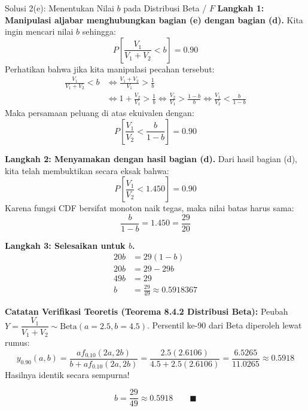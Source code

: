 \documentclass[10pt,twoside]{article}
\begin{document}
\begin{solbox}{Solusi 2(e): Menentukan Nilai $b$ pada Distribusi Beta / $F$}
\textbf{Langkah 1: Manipulasi aljabar menghubungkan bagian (e) dengan bagian (d).}
Kita ingin mencari nilai $b$ sehingga:
\[
P\left[\frac{V_1}{V_1 + V_2} < b\right] = 0.90
\]
Perhatikan bahwa jika kita manipulasi pecahan tersebut:
\begin{align*}
  \frac{V_1}{V_1 + V_2} < b &\iff \frac{V_1 + V_2}{V_1} > \frac{1}{b} \\
  &\iff 1 + \frac{V_2}{V_1} > \frac{1}{b} \iff \frac{V_2}{V_1} > \frac{1 - b}{b} \iff \frac{V_1}{V_2} < \frac{b}{1 - b}
\end{align*}
Maka persamaan peluang di atas ekuivalen dengan:
\[
P\left[\frac{V_1}{V_2} < \frac{b}{1 - b}\right] = 0.90
\]

\textbf{Langkah 2: Menyamakan dengan hasil bagian (d).}
Dari hasil bagian (d), kita telah membuktikan secara eksak bahwa:
\[
P\left[\frac{V_1}{V_2} < 1.450\right] = 0.90
\]
Karena fungsi CDF bersifat monoton naik tegas, maka nilai batas harus sama:
\[
\frac{b}{1 - b} = 1.450 = \frac{29}{20}
\]

\textbf{Langkah 3: Selesaikan untuk $b$.}
\begin{align*}
  20 b &= 29(1 - b) \\
  20 b &= 29 - 29 b \\
  49 b &= 29 \\
  b &= \frac{29}{49} \approx 0.5918367
\end{align*}

\textbf{Catatan Verifikasi Teoretis (Teorema 8.4.2 Distribusi Beta):}
Peubah $Y = \dfrac{V_1}{V_1 + V_2} \sim \text{Beta}(a = 2.5, b = 4.5)$.
Persentil ke-90 dari Beta diperoleh lewat rumus:
\[
y_{0.90}(a, b) = \frac{a f_{0.10}(2a, 2b)}{b + a f_{0.10}(2a, 2b)} = \frac{2.5(2.6106)}{4.5 + 2.5(2.6106)} = \frac{6.5265}{11.0265} \approx 0.5918
\]
Hasilnya identik secara sempurna!

\[
\boxed{b = \frac{29}{49} \approx 0.5918} \qquad \blacksquare
\]
\end{solbox}
\end{document}
